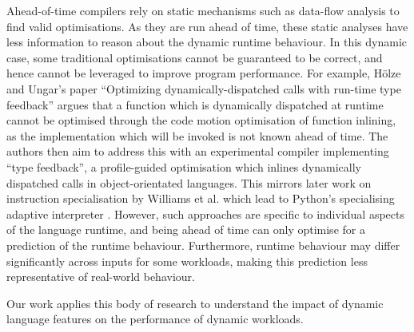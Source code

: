 Ahead-of-time compilers rely on static mechanisms such as data-flow analysis to find valid optimisations.
As they are run ahead of time, these static analyses have less information to reason about the dynamic runtime behaviour. In this dynamic case, some traditional optimisations cannot be guaranteed to be correct, and hence cannot be leveraged to improve program performance. For example, H\"olze and Ungar's paper ``Optimizing dynamically-dispatched calls with run-time type feedback'' \cite{holzleOptimizingDynamicallydispatchedCalls1994} argues that a function which is dynamically dispatched at runtime cannot be optimised through the code motion optimisation of function inlining, as the implementation which will be invoked is not known ahead of time.
The authors then aim to address this with an experimental compiler implementing ``type feedback'', a profile-guided optimisation which inlines dynamically dispatched calls in object-orientated languages. This mirrors later work on instruction specialisation by Williams et al. \cite{williamsDynamicInterpretationDynamic2010} which lead to Python's specialising adaptive interpreter \cite{pep659}.
However, such approaches are specific to individual aspects of the language runtime, and being ahead of time can only optimise for a prediction of the runtime behaviour.
Furthermore, runtime behaviour may differ significantly across inputs for some workloads, making this prediction less representative of real-world behaviour.


Our work applies this body of research to understand the impact of dynamic language features on the performance of dynamic workloads.
